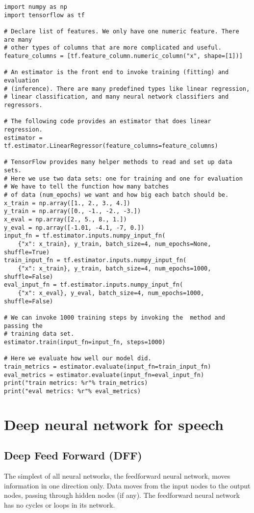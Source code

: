 \begin{adjustbox}{width=\textwidth}
\begin{lstlisting}
import numpy as np
import tensorflow as tf

# Declare list of features. We only have one numeric feature. There are many
# other types of columns that are more complicated and useful.
feature_columns = [tf.feature_column.numeric_column("x", shape=[1])]

# An estimator is the front end to invoke training (fitting) and evaluation
# (inference). There are many predefined types like linear regression,
# linear classification, and many neural network classifiers and regressors.

# The following code provides an estimator that does linear regression.
estimator = tf.estimator.LinearRegressor(feature_columns=feature_columns)

# TensorFlow provides many helper methods to read and set up data sets.
# Here we use two data sets: one for training and one for evaluation
# We have to tell the function how many batches
# of data (num_epochs) we want and how big each batch should be.
x_train = np.array([1., 2., 3., 4.])
y_train = np.array([0., -1., -2., -3.])
x_eval = np.array([2., 5., 8., 1.])
y_eval = np.array([-1.01, -4.1, -7, 0.])
input_fn = tf.estimator.inputs.numpy_input_fn(
    {"x": x_train}, y_train, batch_size=4, num_epochs=None, shuffle=True)
train_input_fn = tf.estimator.inputs.numpy_input_fn(
    {"x": x_train}, y_train, batch_size=4, num_epochs=1000, shuffle=False)
eval_input_fn = tf.estimator.inputs.numpy_input_fn(
    {"x": x_eval}, y_eval, batch_size=4, num_epochs=1000, shuffle=False)

# We can invoke 1000 training steps by invoking the  method and passing the
# training data set.
estimator.train(input_fn=input_fn, steps=1000)

# Here we evaluate how well our model did.
train_metrics = estimator.evaluate(input_fn=train_input_fn)
eval_metrics = estimator.evaluate(input_fn=eval_input_fn)
print("train metrics: %r"% train_metrics)
print("eval metrics: %r"% eval_metrics)
\end{lstlisting}
\end{adjustbox}

 \section{Deep neural network for speech}
\subsection{Deep Feed Forward (DFF)}
The simplest of all neural networks, the feedforward neural network, moves information in one direction only.
Data moves from the input nodes to the output nodes,
passing through hidden nodes (if any).
The feedforward neural network has no cycles or loops in its network.

